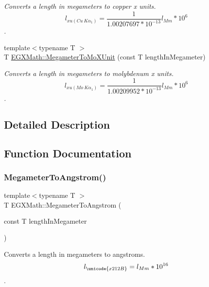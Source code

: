 \begin{DoxyCompactItemize}
\begin{DoxyCompactList}\small\item\em Converts a length in megameters to copper x units. \[ l_{xu(Cu\ K\alpha_1)}= \frac{1}{1.00207697*10^{-13}} l_{Mm} * 10^{6}\]. \end{DoxyCompactList}\item 
{\footnotesize template$<$typename T $>$ }\\T \mbox{\hyperlink{group___e_g_x_math-_conversions-_length_conversions-_megameter-_non-_s_i_ga134a9fb2603b93c739c4ee58864f69c6}{E\+G\+X\+Math\+::\+Megameter\+To\+Mo\+X\+Unit}} (const T length\+In\+Megameter)
\begin{DoxyCompactList}\small\item\em Converts a length in megameters to molybdenum x units. \[ l_{xu(Mo\ K\alpha_1)}=\frac{1}{1.00209952*10^{-13}} l_{Mm} * 10^{6}\]. \end{DoxyCompactList}\end{DoxyCompactItemize}


\subsection{Detailed Description}


\subsection{Function Documentation}
\mbox{\label{group___e_g_x_math-_conversions-_length_conversions-_megameter-_non-_s_i_gac4c7e615f4ec3d000ac341a5bf9a79a0}} 
\subsubsection{\texorpdfstring{Megameter\+To\+Angstrom()}{MegameterToAngstrom()}}
{\footnotesize\ttfamily template$<$typename T $>$ \\
T E\+G\+X\+Math\+::\+Megameter\+To\+Angstrom (\begin{DoxyParamCaption}\item[{const T}]{length\+In\+Megameter }\end{DoxyParamCaption})}



Converts a length in megameters to angstroms. \[ l_{\unicode{x212B}}=l_{Mm} * 10^{16} \]. 

